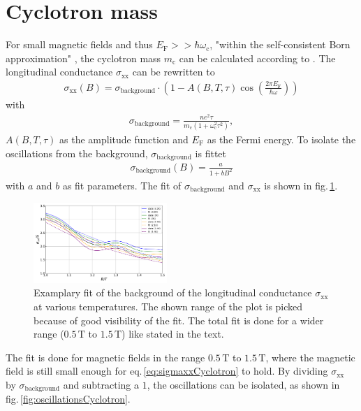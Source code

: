 \section{Cyclotron mass}
For small magnetic fields and thus $E_\text{F}>>\hbar\omega_\text{c}$, "within the self-consistent Born approximation" \cite{Tasksheet}, the cyclotron mass $m_\text{c}$ can be calculated according to \cite{Ando}. 
The longitudinal conductance $\sigma_\text{xx}$ can be rewritten to
\begin{align}
    \sigma_\text{xx}(B) = \sigma_\text{background}\cdot\left(1-A(B,T,\tau)\cos{\left(\frac{2\pi E_\text{F}}{\hbar\omega}\right)}\right) \label{eq:sigmaxxCyclotron}
\end{align} 
with 
\begin{align}
    \sigma_\text{background}=\frac{ne^2\tau}{m_\text{c}(1+\omega_\text{c}^2\tau^2)},
\end{align}
$A(B,T,\tau)$ as the amplitude function and $E_\text{F}$ as the Fermi energy.
To isolate the oscillations from the background, $\sigma_\text{background}$ is fittet
\begin{align}
    \sigma_\text{background}(B) = \frac{a}{1+bB^2}
    \label{eq:fit}
\end{align}
with $a$ and $b$ as fit parameters. The fit of $\sigma_\text{background}$ and $\sigma_\text{xx}$ is shown in fig.\,\ref{fig:fitCyclotron}.
\begin{figure}[h]
    \centering
    \includegraphics[width=0.45\textwidth]{../Images/sigmaWithFit.png}
    \caption{Examplary fit of the background of the longitudinal conductance $\sigma_\text{xx}$ at various temperatures. 
    The shown range of the plot is picked because of good visibility of the fit. The total fit is done for a wider range ($0.5\,\text{T}$ to $1.5\,\text{T}$) like stated in the text.}
    \label{fig:fitCyclotron}
\end{figure}
The fit is done for magnetic fields in the range $0.5\,\text{T}$ to $1.5\,\text{T}$, where the magnetic field is still small enough for eq.\,\ref{eq:sigmaxxCyclotron} to hold.
By dividing $\sigma_\text{xx}$ by $\sigma_\text{background}$ and subtracting a $1$, the oscillations can be isolated, as shown in fig.\,\ref{fig:oscillationsCyclotron}.
